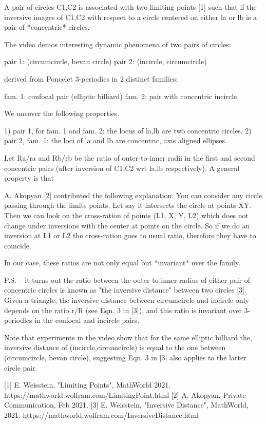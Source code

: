 A pair of circles C1,C2 is associated with two limiting points [1] such that if the inversive images of C1,C2 with respect to a circle centered on either la or lb is a  pair of *concentric* circles. 

The video demos interesting dynamic phenomena of two pairs of circles:

pair 1: (circumcircle, bevan circle)
pair 2: (incircle, circumcircle)

derived from Poncelet 3-periodics in 2 distinct families:

fam. 1: confocal pair (elliptic billiard)
fam. 2: pair with concentric incircle

We uncover the following properties.

1) pair 1, for fam. 1 and fam. 2: the locus of la,lb are two concentric circles. 
2) pair 2, fam. 1: the loci of la and lb are concentric, axis aligned ellipses. 

Let Ra/ra and Rb/rb be the ratio of outer-to-inner radii in the first and second concentric pairs (after inversion of C1,C2 wrt la,lb respectively). A general property is that 

A. Akopyan [2] contributed the following explanation: You can consider any circle passing through the limits points. Let say it intersects the circle at points XY. Then we can look on the cross-ration of points (L1, X, Y, L2) which does not change under inversions with the center at points on the circle. So if we do an inversion at L1 or L2 the cross-ration goes to usual ratio, therefore they have to coincide.

In our case, these ratios are not only equal but *invariant* over the family.

P.S. -- it turns out the ratio between the outer-to-inner radius of either pair of concentric circles is known as "the inversive distance" between two circles [3]. Given a triangle, the inversive distance between circumcircle and incircle only depends on the ratio r/R (see Eqn. 3 in [3]), and this ratio is invariant over 3-periodics in the confocal and incircle pairs.

Note that experiments in the video show that for the same elliptic billiard the, inversive distance of (incircle,circumcircle) is equal to the one between (circumcircle, bevan circle), suggesting Eqn. 3 in [3] also applies to the latter circle pair.

[1] E. Weisstein, "Limiting Points", MathWorld 2021. https://mathworld.wolfram.com/LimitingPoint.html
[2] A. Akopyan, Private Communication, Feb 2021.
[3] E. Weisstein, "Inversive Distance", MathWorld, 2021. https://mathworld.wolfram.com/InversiveDistance.html